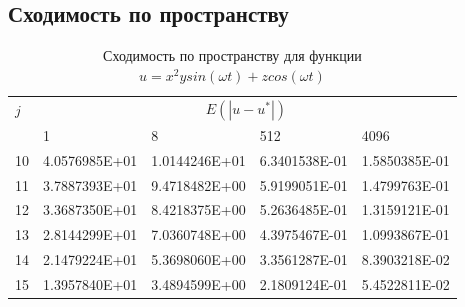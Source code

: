 \documentclass[12pt]{article}
\begin{document}
\subsection{Сходимость по пространству}

\begin{table}[H]
  \begin{tabularx}{\textwidth}{lYYYY}
  \toprule
    $j$ &                             \\
        & 1             & 8             & 512           & 4096          \\
    10	& 4.0576985E+01	& 1.0144246E+01	& 6.3401538E-01	& 1.5850385E-01 \\
    11	& 3.7887393E+01	& 9.4718482E+00	& 5.9199051E-01	& 1.4799763E-01 \\
    12	& 3.3687350E+01	& 8.4218375E+00	& 5.2636485E-01	& 1.3159121E-01 \\
    13	& 2.8144299E+01	& 7.0360748E+00	& 4.3975467E-01	& 1.0993867E-01 \\
    14	& 2.1479224E+01	& 5.3698060E+00	& 3.3561287E-01	& 8.3903218E-02 \\
    15	& 1.3957840E+01	& 3.4894599E+00	& 2.1809124E-01	& 5.4522811E-02 \\
  \bottomrule
  \end{tabularx}
  \caption{Сходимость по пространству для функции $u = x^2ysin(\omega t) + zcos(\omega t)$}
\end{table}
\end{document}
